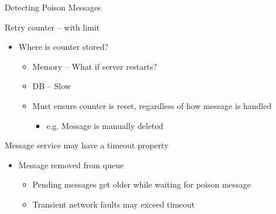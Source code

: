 \documentclass{slide}
\begin{document}
\begin{frame}{Detecting Poison Messages}
    \vspace{1mm}
    {\LARGE
        Retry counter -- with limit
        \begin{itemize}
            \Large\item Where is counter stored?
            \begin{itemize}
                \large\item Memory -- What if server restarts?
                \vspace{1mm}
                \large\item DB -- Slow
                \vspace{2mm}
                \large\item Must ensure counter is reset, regardless of how message is handled
                \begin{itemize}
                    \item e.g. Message is manually deleted
                \end{itemize}
            \end{itemize}
        \end{itemize}
        \pause
        \vspace{3mm}
        Message service may have a timeout property
        \begin{itemize}
            \Large\item Message removed from queue
            \begin{itemize}
                \large\item Pending messages get older while waiting for poison message
                \vspace{1mm}
                \large\item Transient network faults may exceed timeout
            \end{itemize}
        \end{itemize}
    }
\end{frame}
\end{document}
